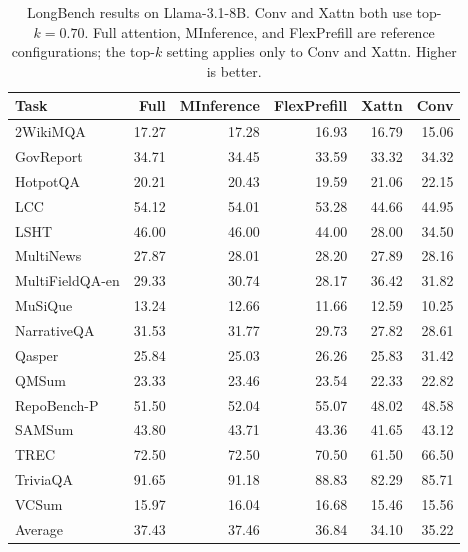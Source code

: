 \begin{table}[t]
    \centering
    \caption{LongBench results on Llama-3.1-8B. Conv and Xattn both use top-$k=0.70$. Full attention, MInference, and FlexPrefill are reference configurations; the top-$k$ setting applies only to Conv and Xattn. Higher is better.}
    \label{tab:longbench_llama_topk}
    \small
    \setlength{\tabcolsep}{5pt}
    \begin{tabular}{lrrrrr}
        \toprule
        Task & Full & MInference & FlexPrefill & Xattn & Conv \\
        \midrule
        2WikiMQA & 17.27 & 17.28 & 16.93 & 16.79 & 15.06 \\
        GovReport & 34.71 & 34.45 & 33.59 & 33.32 & 34.32 \\
        HotpotQA & 20.21 & 20.43 & 19.59 & 21.06 & 22.15 \\
        LCC & 54.12 & 54.01 & 53.28 & 44.66 & 44.95 \\
        LSHT & 46.00 & 46.00 & 44.00 & 28.00 & 34.50 \\
        MultiNews & 27.87 & 28.01 & 28.20 & 27.89 & 28.16 \\
        MultiFieldQA-en & 29.33 & 30.74 & 28.17 & 36.42 & 31.82 \\
        MuSiQue & 13.24 & 12.66 & 11.66 & 12.59 & 10.25 \\
        NarrativeQA & 31.53 & 31.77 & 29.73 & 27.82 & 28.61 \\
        Qasper & 25.84 & 25.03 & 26.26 & 25.83 & 31.42 \\
        QMSum & 23.33 & 23.46 & 23.54 & 22.33 & 22.82 \\
        RepoBench-P & 51.50 & 52.04 & 55.07 & 48.02 & 48.58 \\
        SAMSum & 43.80 & 43.71 & 43.36 & 41.65 & 43.12 \\
        TREC & 72.50 & 72.50 & 70.50 & 61.50 & 66.50 \\
        TriviaQA & 91.65 & 91.18 & 88.83 & 82.29 & 85.71 \\
        VCSum & 15.97 & 16.04 & 16.68 & 15.46 & 15.56 \\
        \midrule
        Average & 37.43 & 37.46 & 36.84 & 34.10 & 35.22 \\
        \bottomrule
    \end{tabular}
\end{table}

